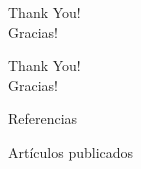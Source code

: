 \documentclass[aspectratio=169,compress]{beamer}
\begin{document}
\begin{frame}%
\begin{center}
\Huge Thank You! \\
\Huge Gracias! \\
\end{center}
\end{frame}

\begin{frame}%
\begin{center}
{\fontsize{40}{50}\selectfont Thank You!}\\
{\fontsize{40}{50}\selectfont Gracias!}
\end{center}
\end{frame}


\renewcommand*{\bibfont}{\tiny}  
\begin{frame}[allowframebreaks]{Referencias}
    \printbibliography[title=Referencias,keyword=secundary]
\end{frame}


\begin{frame}[allowframebreaks]{Artículos publicados}
    \printbibliography[title=Artículos publicados,keyword=primary]
\end{frame}
\end{document}
